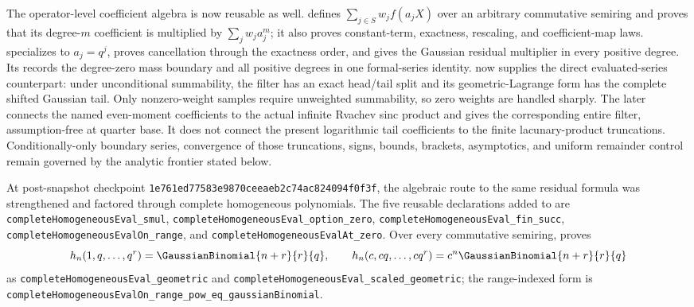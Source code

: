 \documentclass[11pt]{article}
\numberwithin{equation}{section}
\theoremstyle{definition}
\theoremstyle{remark}
\begin{document}
The operator-level coefficient algebra is now reusable as well.
 defines
\(\sum_{j\in S}w_j f(a_jX)\) over an arbitrary commutative semiring and
proves that its degree-\(m\) coefficient is multiplied by
\(\sum_jw_ja_j^m\); it also proves constant-term, exactness, rescaling, and
coefficient-map laws.   specializes
to \(a_j=q^j\), proves cancellation through the exactness order, and gives
the Gaussian residual multiplier in every positive degree.  Its
 records the degree-zero
mass boundary and all positive degrees in one formal-series identity.
 now supplies the direct evaluated-series
counterpart: under unconditional summability, the filter has an exact head/tail
split and its geometric-Lagrange form has the complete shifted Gaussian tail.
Only nonzero-weight samples require unweighted summability, so zero weights are
handled sharply.  The later  connects the
named even-moment coefficients to the actual infinite Rvachev sinc product and
gives the corresponding entire filter, assumption-free at quarter base.  It
does not connect the present logarithmic tail coefficients to the finite
lacunary-product truncations.  Conditionally-only boundary series, convergence
of those truncations, signs, bounds, brackets, asymptotics, and uniform
remainder control remain governed by the analytic frontier stated below.

At post-snapshot checkpoint
\nolinkurl{1e761ed77583e9870ceeaeb2c74ac824094f0f3f}, the algebraic route to the
same residual formula was strengthened and factored through complete
homogeneous polynomials.  The five reusable declarations added to
 are
\nolinkurl{completeHomogeneousEval_smul},
\nolinkurl{completeHomogeneousEval_option_zero},
\nolinkurl{completeHomogeneousEval_fin_succ},
\nolinkurl{completeHomogeneousEvalOn_range}, and
\nolinkurl{completeHomogeneousEvalAt_zero}.  Over every commutative semiring,
 proves
\[
 h_n(1,q,\ldots,q^r)=\GaussianBinomial{n+r}{r}{q},
 \qquad
 h_n(c,cq,\ldots,cq^r)=c^n\GaussianBinomial{n+r}{r}{q}
\]
as \nolinkurl{completeHomogeneousEval_geometric} and
\nolinkurl{completeHomogeneousEval_scaled_geometric}; the range-indexed form
is
\nolinkurl{completeHomogeneousEvalOn_range_pow_eq_gaussianBinomial}.
\end{document}
